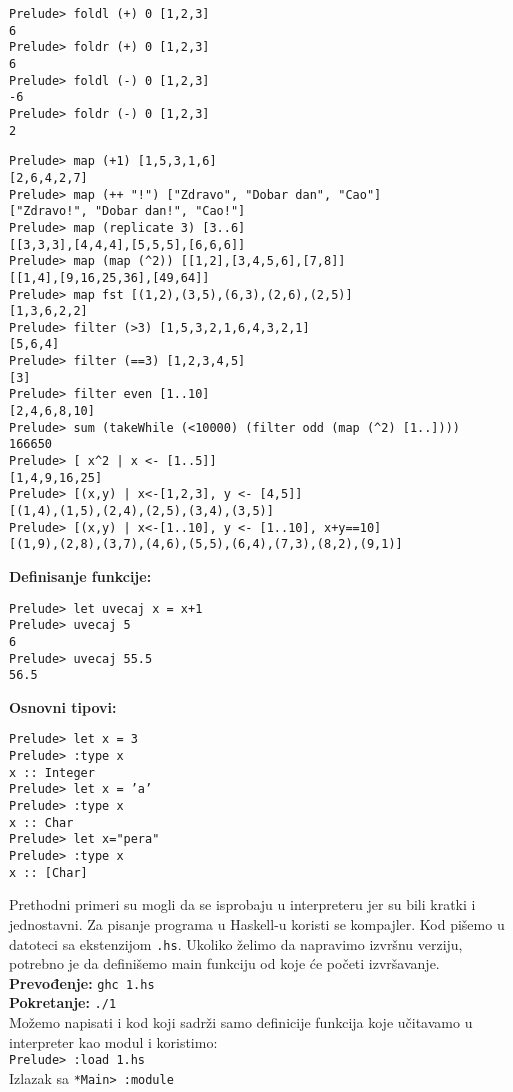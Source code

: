 \documentclass[../main.tex]{subfiles}
\begin{document}
\begin{boxprimer}[width=\linewidth/2]
\begin{Verbatim}
Prelude> foldl (+) 0 [1,2,3]
6
Prelude> foldr (+) 0 [1,2,3]
6
Prelude> foldl (-) 0 [1,2,3]
-6
Prelude> foldr (-) 0 [1,2,3]
2
\end{Verbatim}
\end{boxprimer}


\begin{boxprimer}[breakable]
\begin{Verbatim}
Prelude> map (+1) [1,5,3,1,6]
[2,6,4,2,7]
Prelude> map (++ "!") ["Zdravo", "Dobar dan", "Cao"]
["Zdravo!", "Dobar dan!", "Cao!"]
Prelude> map (replicate 3) [3..6]
[[3,3,3],[4,4,4],[5,5,5],[6,6,6]]
Prelude> map (map (^2)) [[1,2],[3,4,5,6],[7,8]]
[[1,4],[9,16,25,36],[49,64]]
Prelude> map fst [(1,2),(3,5),(6,3),(2,6),(2,5)]
[1,3,6,2,2]
Prelude> filter (>3) [1,5,3,2,1,6,4,3,2,1]
[5,6,4]
Prelude> filter (==3) [1,2,3,4,5]
[3]
Prelude> filter even [1..10]
[2,4,6,8,10]
Prelude> sum (takeWhile (<10000) (filter odd (map (^2) [1..])))
166650
Prelude> [ x^2 | x <- [1..5]]
[1,4,9,16,25]
Prelude> [(x,y) | x<-[1,2,3], y <- [4,5]]
[(1,4),(1,5),(2,4),(2,5),(3,4),(3,5)]
Prelude> [(x,y) | x<-[1..10], y <- [1..10], x+y==10]
[(1,9),(2,8),(3,7),(4,6),(5,5),(6,4),(7,3),(8,2),(9,1)]

\end{Verbatim}
\end{boxprimer}

\begin{multicols}{2}
{\bf Definisanje funkcije:}
\begin{boxprimer}%
\begin{Verbatim}
Prelude> let uvecaj x = x+1
Prelude> uvecaj 5
6
Prelude> uvecaj 55.5
56.5
\end{Verbatim}
\end{boxprimer}
\columnbreak
{\bf Osnovni tipovi:}
\begin{boxprimer}%
\begin{Verbatim}
Prelude> let x = 3
Prelude> :type x
x :: Integer
Prelude> let x = ’a’
Prelude> :type x
x :: Char
Prelude> let x="pera"
Prelude> :type x
x :: [Char]
\end{Verbatim}
\end{boxprimer}
\end{multicols}
Prethodni primeri su mogli da se isprobaju u interpreteru jer su bili kratki i jednostavni. Za pisanje programa u Haskell-u koristi se kompajler. Kod pišemo u datoteci sa ekstenzijom \texttt{.hs}. Ukoliko želimo da napravimo izvršnu verziju, potrebno je da definišemo main funkciju od koje će početi izvršavanje.
\\
{\bf Prevođenje:} \texttt{ghc 1.hs}
\\
{\bf Pokretanje:} \texttt{./1}
\\
Možemo napisati i kod koji sadrži samo definicije funkcija koje učitavamo u interpreter kao modul i koristimo:
\\
\texttt{Prelude> :load 1.hs}
\\
Izlazak sa \texttt{*Main> :module}
\end{document}
